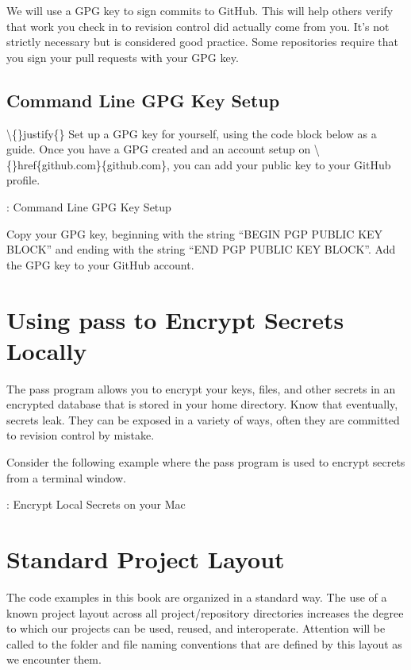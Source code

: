 \justify{}
We will use a GPG key to sign commits to GitHub. This will help others verify that work you check in to revision
control did actually come from you. It's not strictly necessary but is considered good practice.
Some repositories require that you sign your pull requests with your GPG key.

\subsection{Command Line GPG Key Setup}

\textbackslash\{\}justify\{\}
Set up a GPG key for yourself, using the code block below as a guide. Once you have a GPG created and an account setup
on \textbackslash\{\}href\{github.com\}\{github.com\}, you can add your public key to your GitHub profile.

\begin{mybox}{\thetcbcounter: Command Line GPG Key Setup}

\end{mybox}

\justify{}
Copy your GPG key, beginning with the string ``BEGIN PGP PUBLIC KEY BLOCK'' and ending with the string
``END PGP PUBLIC KEY BLOCK''. Add the GPG key to your GitHub account.

\section{Using pass to Encrypt Secrets Locally}

\justify{}
The pass program allows you to encrypt your keys, files, and other secrets in an encrypted database that is
stored in your home directory. Know that eventually, secrets leak. They can be exposed in a variety of ways, 
often they are committed to revision control by mistake.

\justify{}
Consider the following example where the pass program is used to encrypt secrets from a terminal window.

\begin{mybox}{\thetcbcounter: Encrypt Local Secrets on your Mac}

\end{mybox}

\section{Standard Project Layout}

\justify{}
The code examples in this book are organized in a standard way. The use of a known project 
layout across all project/repository directories increases the degree to which our projects can be used, reused, and
interoperate. Attention will be called to the folder and file naming conventions that are defined by this layout
as we encounter them.

